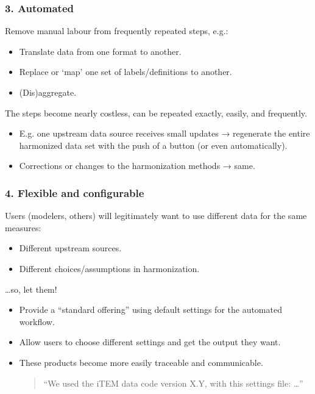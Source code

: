 \documentclass[12pt,aspectratio=169]{beamer}
\begin{document}
\begin{frame}
\frametitle{3. Automated}

Remove manual labour from frequently repeated steps, e.g.:
\begin{itemize}
  \item Translate data from one format to another.
  \item Replace or ‘map’ one set of labels/definitions to another.
  \item (Dis)aggregate.
\end{itemize}

\bigskip
The steps become nearly costless, can be repeated exactly, easily, and frequently.

\begin{itemize}
  \item E.g. one upstream data source receives small updates → regenerate the entire harmonized data set with the push of a button (or even automatically).
  \item Corrections or changes to the harmonization methods → same.
\end{itemize}

\end{frame}

\begin{frame}
\frametitle{4. Flexible and configurable}

Users (modelers, others) will legitimately want to use different data for the same measures:
\begin{itemize}
  \item Different upstream sources.
  \item Different choices/assumptions in harmonization.
\end{itemize}

\bigskip
…so, let them!
\begin{itemize}
  \item Provide a “standard offering” using default settings for the automated workflow.
  \item Allow users to choose different settings and get the output they want.
  \item These products become more easily traceable and communicable.
    \begin{quote}
      “We used the iTEM data code version X.Y, with this settings file: …”
    \end{quote}
\end{itemize}

\end{frame}
\end{document}
